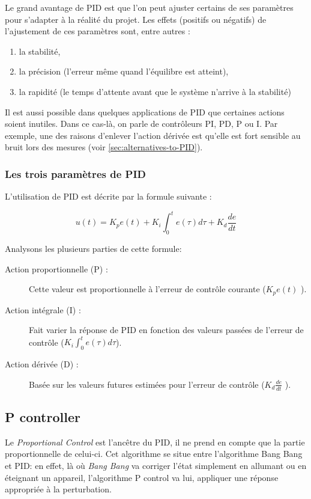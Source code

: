 \documentclass[a4paper,10pt]{report}
\begin{document}
Le grand avantage de PID est que l'on peut ajuster certains de ses paramètres pour s'adapter à la réalité du projet.
Les effets (positifs ou négatifs) de l'ajustement de ces paramètres sont, entre autres \cite{zhong2006pid} :
\begin{enumerate}
\item la stabilité,
\item la précision (l'erreur même quand l'équilibre est atteint),
\item la rapidité (le temps d'attente avant que le système n'arrive à la stabilité)
\end{enumerate}

Il est aussi possible dans quelques applications de PID que certaines actions soient inutiles.
Dans ce cas-là, on parle de contrôleurs PI, PD, P ou I.
Par exemple, une des raisons d'enlever l'action dérivée est qu'elle est fort sensible au bruit lors des mesures
(voir \ref{sec:alternatives-to-PID}).

\subsubsection{Les trois paramètres de PID}
L'utilisation de PID est décrite par la formule suivante\cite{visioli2006practical} :

$$u(t) = K_p e(t) + K_i \int_{0}^{t} e(\tau) d\tau + K_d \frac{de}{dt}$$

Analysons les plusieurs parties de cette formule:

\begin{description}
\item[Action proportionnelle (P) :]
    Cette valeur est proportionnelle à l'erreur de contrôle courante ($K_p e(t)$ ).
\item[Action intégrale (I) :]
    Fait varier la réponse de PID en fonction des valeurs passées de l'erreur de contrôle ($K_i \int_{0}^{t} e(\tau) d\tau$).
\item[Action dérivée (D) :]
    Basée sur les valeurs futures estimées pour l'erreur de contrôle ($K_d \frac{de}{dt}$ ).
\end{description}


\subsection{P controller}
Le \emph{Proportional Control} est l'ancêtre du PID, il ne prend en compte que la partie proportionnelle de celui-ci.
Cet algorithme se situe entre l'algorithme Bang Bang et PID:
en effet, là où \emph{Bang Bang} va corriger l'état simplement en allumant ou en éteignant un appareil, l'algorithme P control va lui, appliquer une réponse appropriée à la perturbation.
\end{document}

